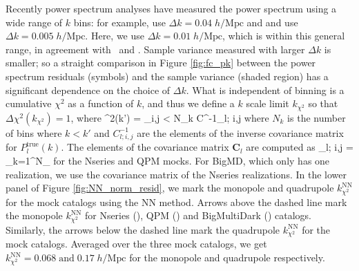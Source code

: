 Recently power spectrum analyses have measured the power spectrum using a wide range of 
$k$ bins: for example, \cite{Anderson:2012aa} use $\Delta k = 0.04 \;h/\mathrm{Mpc}$ and \cite{Beutler:2014aa} and \cite{Grieb:2016aa} use 
$\Delta k = 0.005\;h/\mathrm{Mpc}$. Here, we use $\Delta k = 0.01\;h/\mathrm{Mpc}$, 
which is within this general range, in agreement with~\cite{Beutler:2016aa} and \cite{Gil-Marin:2016ab}. Sample variance measured with larger $\Delta k$ 
is smaller; so a straight comparison in Figure \ref{fig:fc_pk} between the power spectrum residuals (symbols) 
and the sample variance (shaded region) has a significant dependence on 
the choice of $\Delta k$. What is independent of binning is a cumulative $\chi^2$ as a function of $k$, and thus we define a $k$ scale limit $k_{\chi^2}$  
so that $\Delta  \chi^2(k_{\chi^2}) = 1$, where 
\beq \label{eq:chisquared}
\Delta \chi^2(k') = \sum\limits_{i,j < N_k} 
 C^{-1}_{l;\; i,j}
\eeq
where $N_k$ is the number of bins where $k < k'$ and $C^{-1}_{l; i,j}$ are the elements of the
inverse covariance matrix for $P_l^\mathrm{true}(k)$. The elements of the covariance matrix 
$\mathbf{C}_l$ are computed as 
\beq
{}_{l;\; i,j} = \sum_{k=1}^{N_{}}
\nonumber
\eeq
for the Nseries and QPM mocks. For BigMD, which only has one realization, we use the
covariance matrix of the Nseries realizations.  In the lower panel of Figure \ref{fig:NN_norm_resid}, 
we mark the monopole and quadrupole $k^\mathrm{NN}_{\chi^2}$ for the mock 
catalogs using the NN method. Arrows above the dashed line mark the monopole 
$k^\mathrm{NN}_{\chi^2}$ for Nseries (\nseriescolor), QPM (\qpmcolor) and 
BigMultiDark (\bmdcolor) catalogs. Similarly, the arrows below the dashed line 
mark the quadrupole $k^\mathrm{NN}_{\chi^2}$ for the mock catalogs. 
Averaged over the three mock catalogs, we get $k^\mathrm{NN}_{\chi^2} = 0.068 
\;\mathrm{and}\; 0.17\;h/\mathrm{Mpc}$ for the monopole and quadrupole respectively.

